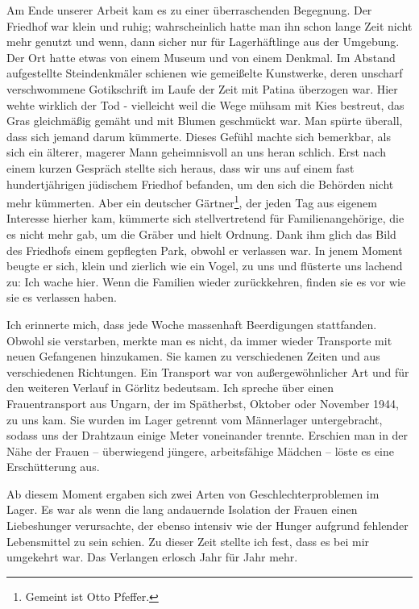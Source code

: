 \documentclass[a4paper,12pt,ngerman,
]{nisebook}
\begin{document}
Am Ende unserer Arbeit kam es zu einer überraschenden Begegnung. Der Friedhof war klein und ruhig; wahrscheinlich hatte man ihn schon lange Zeit nicht mehr genutzt und wenn, dann sicher nur für Lagerhäftlinge aus der Umgebung. Der Ort hatte etwas von einem Museum und von einem Denkmal. Im Abstand aufgestellte Steindenkmäler schienen wie gemeißelte Kunstwerke, deren unscharf verschwommene Gotikschrift im Laufe der Zeit mit Patina überzogen war. Hier wehte wirklich der Tod - vielleicht weil die Wege mühsam mit Kies bestreut, das Gras gleichmäßig gemäht und mit Blumen geschmückt war. Man spürte überall, dass sich jemand darum kümmerte. Dieses Gefühl machte sich bemerkbar, als sich ein älterer, magerer Mann geheimnisvoll an uns heran schlich. Erst nach einem kurzen Gespräch stellte sich heraus, dass wir uns auf einem fast hundertjährigen jüdischem Friedhof befanden, um den sich die Behörden nicht mehr kümmerten. Aber ein deutscher Gärtner\footnote{Gemeint ist Otto Pfeffer.}, der jeden Tag aus eigenem Interesse hierher kam, kümmerte sich stellvertretend für Familienangehörige, die es nicht mehr gab, um die Gräber und hielt Ordnung. Dank ihm glich das Bild des Friedhofs einem gepflegten Park, obwohl er verlassen war. In jenem Moment beugte er sich, klein und zierlich wie ein Vogel, zu uns und flüsterte uns lachend zu:  \glqq Ich wache hier. Wenn die Familien wieder zurückkehren, finden sie es vor wie sie es verlassen haben.\grqq

Ich erinnerte mich, dass jede Woche massenhaft Beerdigungen stattfanden. Obwohl sie verstarben, merkte man es nicht, da immer wieder Transporte mit neuen Gefangenen hinzukamen. Sie kamen zu verschiedenen Zeiten und aus verschiedenen Richtungen. Ein Transport war von außergewöhnlicher Art und für den weiteren Verlauf in Görlitz bedeutsam. Ich spreche über einen Frauentransport aus Ungarn, der im Spätherbst, Oktober oder November 1944, zu uns kam. Sie wurden im Lager getrennt vom Männerlager untergebracht,  sodass uns der Drahtzaun einige Meter voneinander trennte. Erschien man in der Nähe der Frauen -- überwiegend jüngere, arbeitsfähige Mädchen -- löste es eine Erschütterung aus.

Ab diesem Moment ergaben sich zwei Arten von Geschlechterproblemen im Lager.
Es war als wenn die lang andauernde Isolation der Frauen einen Liebeshunger verursachte, der ebenso intensiv wie der Hunger aufgrund fehlender Lebensmittel zu sein schien. Zu dieser Zeit stellte ich fest, dass es bei mir umgekehrt war. Das Verlangen erlosch Jahr für Jahr mehr.
\end{document}
